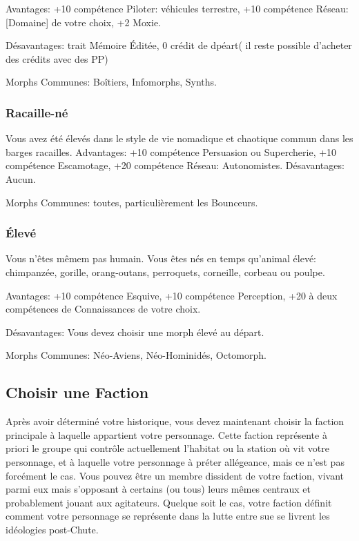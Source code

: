Avantages: +10 compétence Piloter: véhicules terrestre, +10 compétence Réseau: [Domaine] de votre choix, +2 Moxie. 

Désavantages: trait Mémoire Éditée, 0 crédit de dpéart( il reste possible d'acheter des crédits avec des PP) 

Morphs Communes: Boîtiers, Infomorphs, Synths. 

\subsubsection{Racaille-né} \label{sec:scumborn} 

Vous avez été élevés dans le style de vie nomadique et chaotique commun dans les barges racailles. Advantages: +10 compétence Persuasion ou Supercherie, +10 compétence Escamotage, +20 compétence Réseau: Autonomistes.  Désavantages: Aucun. 

Morphs Communes: toutes, particulièrement les Bounceurs. 

\subsubsection{Élevé} \label{sec:uplift} 

Vous n'êtes mêmem pas humain. Vous êtes nés en temps qu'animal élevé: chimpanzée, gorille, orang-outans, perroquets, corneille, corbeau ou poulpe. 

Avantages: +10 compétence Esquive, +10 compétence Perception, +20 à deux compétences de Connaissances de votre choix. 

Désavantages: Vous devez choisir une morph élevé au départ. 

Morphs Communes: Néo-Aviens, Néo-Hominidés, Octomorph. 

\subsection{Choisir une Faction} \label{sec:choose-faction} 

Après avoir déterminé votre historique, vous devez maintenant choisir la faction principale à laquelle appartient votre personnage. Cette faction représente à priori le groupe qui contrôle actuellement l'habitat ou la station où vit votre personnage, et à laquelle votre personnage à préter allégeance, mais ce n'est pas forcément le cas. Vous pouvez être un membre dissident de votre faction, vivant parmi eux mais s'opposant à certains (ou tous) leurs mêmes centraux et probablement jouant aux agitateurs. Quelque soit le cas, votre faction définit comment votre personnage se représente dans la lutte entre sue se livrent les idéologies post-Chute. 

